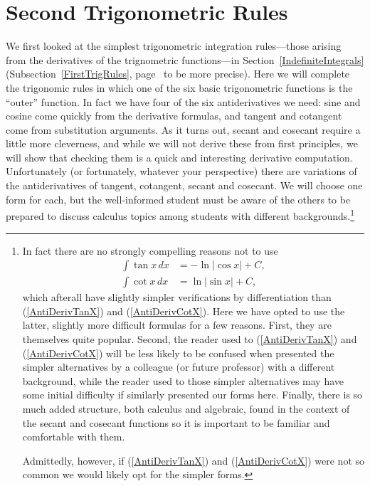 \section{Second Trigonometric Rules\label{SecondTrigRules}}
We first looked at the simplest trigonometric integration rules---those
arising from the derivatives of the trignometric functions---in
Section~\ref{IndefiniteIntegrals}
(Subsection~\ref{FirstTrigRules}, page~\pageref{FirstTrigRules}
to be more precise).  Here we will complete the trigonomic rules
in which one of the six basic trigonometric functions is the ``outer''
function.  In fact we have four of the six antiderivatives we need:
sine and cosine come quickly from the derivative formulas, and
tangent and cotangent come from substitution arguments.  As it turns
out, secant and cosecant require a little more cleverness, and while
we will not derive these from first principles, we will show that
checking them is a quick and interesting derivative computation.
Unfortunately (or fortunately, whatever your perspective) there
are variations of the antiderivatives of tangent, cotangent, secant
and cosecant.  We will choose one form for each, but the well-informed
student must be aware of the others to be prepared to discuss calculus
topics among students with different backgrounds.\footnote{%
In fact there are no strongly compelling reasons not to use 
\begin{align*}
\int\tan x\,dx&=-\ln|\cos x|+C,\\
\int\cot x\,dx&=\ln|\sin x|+C,\end{align*}
which afterall have slightly simpler verifications by differentiation than
(\ref{AntiDerivTanX}) and (\ref{AntiDerivCotX}).  Here we have opted to
use the latter, 
slightly more difficult formulas for a few reasons.
First, they are themselves
quite popular.  Second, the reader used to (\ref{AntiDerivTanX}) and
(\ref{AntiDerivCotX}) will be less likely to be confused when presented
the simpler alternatives by a colleague (or future professor) with a different
background, while the reader used to those simpler
alternatives may have some initial difficulty if similarly
presented our forms here.  Finally, there is so much added
structure, both calculus and algebraic, found in the context of the
secant and cosecant
functions so  it is important to be familiar and comfortable with them.

Admittedly, however, if (\ref{AntiDerivTanX}) and (\ref{AntiDerivCotX})
were not so common we would likely opt for the simpler forms.
}

